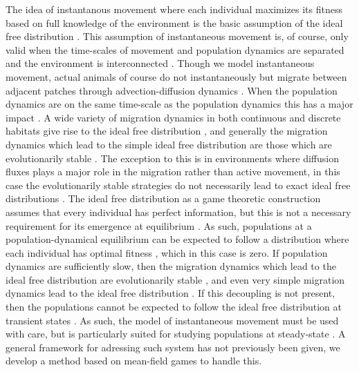 The idea of instantanous movement where each individual maximizes its fitness based on full knowledge of the environment is the basic assumption of the ideal free distribution \citep{kvrivan2008ideal}. This assumption of instantaneous movement is, of course, only valid when the time-scales of movement and population dynamics are separated and the environment is interconnected \citep{cressman2006migration}. Though we model instantaneous movement, actual animals of course do not instantaneously but migrate between adjacent patches through advection-diffusion dynamics \citep{cantrell2010evolution}. When the population dynamics are on the same time-scale as the population dynamics this has a major impact \citep{abrams2007role}. A wide variety of migration dynamics in both continuous and discrete habitats give rise to the ideal free distribution \citep{averill2012several}, and generally the migration dynamics which lead to the simple ideal free distribution are those which are evolutionarily stable \citep{cantrell2010evolution}. The exception to this is in environments where diffusion fluxes plays a major role in the migration rather than active movement, in this case the evolutionarily stable strategies do not necessarily lead to exact ideal free distributions \citep{cantrell2010evolution}. The ideal free distribution as a game theoretic construction assumes that every individual has perfect information, but this is not a necessary requirement for its emergence at equilibrium \citep{flaxman2011evolutionary}. As such, populations at a population-dynamical equilibrium can be expected to follow a distribution where each individual has optimal fitness \citep{stephen2007ideal, cressman2010ideal}, which in this case is zero. If population dynamics are sufficiently slow, then the migration dynamics which lead to the ideal free distribution are evolutionarily stable \citep{cantrell2020evolution}, and even very simple migration dynamics lead to the ideal free distribution \citep{avgar2020habitat}. If this decoupling is not present, then the populations cannot be expected to follow the ideal free distribution at transient states \citep{abrams2007role, lou2014approaching}. As such, the model of instantaneous movement must be used with care, but is particularly suited for studying populations at steady-state \citep{cantrell2020evolution, cantrell2010evolution, cantrell2012evolutionaryb, cantrell2012evolutionary}. A general framework for adressing such system has not previously been given, we develop a method based on mean-field games to handle this.

